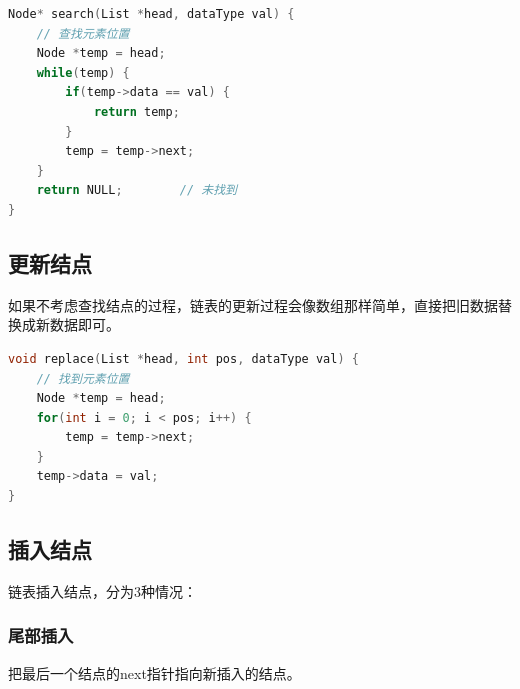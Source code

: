 
\begin{lstlisting}[language=C]
Node* search(List *head, dataType val) {
    // 查找元素位置
    Node *temp = head;
    while(temp) {
        if(temp->data == val) {
            return temp;
        }
        temp = temp->next;
    }
    return NULL;        // 未找到
}
\end{lstlisting}

\subsection{更新结点}

如果不考虑查找结点的过程，链表的更新过程会像数组那样简单，直接把旧数据替换成新数据即可。


\begin{lstlisting}[language=C]
void replace(List *head, int pos, dataType val) {
    // 找到元素位置
    Node *temp = head;
    for(int i = 0; i < pos; i++) {
        temp = temp->next;
    }
    temp->data = val;
}
\end{lstlisting}

\subsection{插入结点}

链表插入结点，分为3种情况：

\subsubsection{尾部插入}

把最后一个结点的next指针指向新插入的结点。

